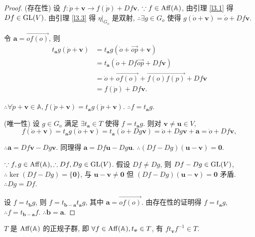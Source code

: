 \documentclass{ctexart}
\begin{document}
\begin{proof}
    (存在性) 设 $f:\dot{p}+\boldsymbol{v}\to f(\dot{p})+Df\boldsymbol{v}$. $\because f\in\operatorname{Aff} (\mathbb{A})$, 由引理 \ref{l3.1} 得 $Df\in\operatorname{GL} (V)$. 由引理 \ref{l3.3} 得 $\eta|_{G_{\dot{o}}}$ 是双射, $\therefore\exists g\in G_{\dot{o}}$ 使得 $g(\dot{o}+\boldsymbol{v})=\dot{o}+Df\boldsymbol{v}$.

    令 $\boldsymbol{a}=\overrightarrow{of(o)}$, 则
    \begin{align*}
        t_{\boldsymbol{a}}g(\dot{p}+\boldsymbol{v}) & =t_{\boldsymbol{a}}g(\dot{o}+\overrightarrow{op}+\boldsymbol{v}) \\
        & =t_{\boldsymbol{a}}(\dot{o}+Df\overrightarrow{op}+Df\boldsymbol{v}) \\
        & =\dot{o}+\overrightarrow{of(o)}+\overrightarrow{f(o)f(p)}+Df\boldsymbol{v} \\
        & =f(\dot{p})+Df\boldsymbol{v}.
    \end{align*}

    $\therefore\forall\dot{p}+\boldsymbol{v}\in\mathbb{A},f(\dot{p}+\boldsymbol{v})=t_{\boldsymbol{a}}g(\dot{p}+\boldsymbol{v})$. $\therefore f=t_{\boldsymbol{a}}g$.

    (唯一性) 设 $g\in G_{\dot{o}}$ 满足 $\exists t_{\boldsymbol{a}}\in T$ 使得 $f=t_{\boldsymbol{a}}g$. 则对 $\boldsymbol{v}\neq\boldsymbol{u}\in V$,
    \[f(\dot{o}+\boldsymbol{v})=t_{\boldsymbol{a}}g(\dot{o}+\boldsymbol{v})=t_{\boldsymbol{a}}(\dot{o}+Dg\boldsymbol{v})=\dot{o}+Dg\boldsymbol{v}+\boldsymbol{a}=\dot{o}+Df\boldsymbol{v},\]

    $\therefore\boldsymbol{a}=Df\boldsymbol{v}-Dg\boldsymbol{v}$. 同理得 $\boldsymbol{a}=Df\boldsymbol{u}-Dg\boldsymbol{u}$. $\therefore(Df-Dg)(\boldsymbol{u}-\boldsymbol{v})=\boldsymbol{0}$.

    $\because f,g\in\operatorname{Aff} (\mathbb{A}),\therefore Df,Dg\in\operatorname{GL} (V)$. 假设 $Df\neq Dg$, 则 $Df-Dg\in\operatorname{GL} (V)$, $\therefore\ker(Df-Dg)=\{\boldsymbol{0}\}$, 与 $\boldsymbol{u}-\boldsymbol{v}\neq\boldsymbol{0}$ 但 $(Df-Dg)(\boldsymbol{u}-\boldsymbol{v})=\boldsymbol{0}$ 矛盾. $\therefore Dg=Df$.

    设 $f=t_{\boldsymbol{b}}g$, 则 $f=t_{\boldsymbol{b}-\boldsymbol{a}}t_{\boldsymbol{a}}g$, 其中 $\boldsymbol{a}=\overrightarrow{of(o)}$. 由存在性的证明得 $f=t_{\boldsymbol{a}}g$, $\therefore f=t_{\boldsymbol{b}-\boldsymbol{a}}f$. $\therefore\boldsymbol{b}=\boldsymbol{a}$.
\end{proof}
\begin{theorem}\label{t3.2}
    $T$ 是 $\operatorname{Aff} (\mathbb{A})$ 的正规子群, 即 $\forall f\in\operatorname{Aff} (\mathbb{A}),t_{\boldsymbol{v}}\in T$, 有 $ft_{\boldsymbol{v}}f^{-1}\in T$.
\end{theorem}
\end{document}

